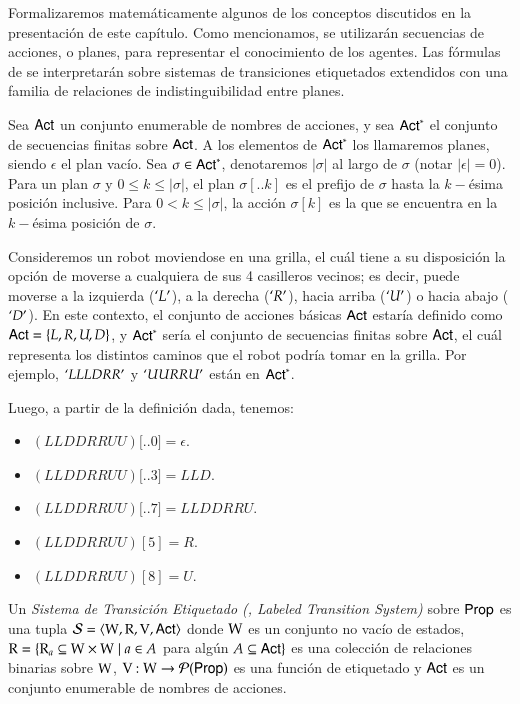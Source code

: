 Formalizaremos matemáticamente algunos de los conceptos discutidos en la presentación de este capítulo. Como mencionamos, se 
utilizarán secuencias de acciones, o planes, para representar el conocimiento de los agentes. Las fórmulas de \KHilogic se interpretarán 
sobre sistemas de transiciones etiquetados extendidos con una familia de relaciones de indistinguibilidad entre planes.

\begin{definicion}
    Sea ${\rm \sf Act}$ un conjunto enumerable de nombres de acciones, y sea ${\rm \sf Act}^*$ el conjunto de secuencias finitas sobre ${\rm \sf Act}$. 
    A los elementos de ${\rm \sf Act}^*$ los llamaremos planes, siendo $\epsilon$ el plan vacío. Sea $\sigma \in {\rm \sf Act}^*$, denotaremos $|\sigma|$ 
    al largo de $\sigma$ (notar $|\epsilon| = 0$). Para un plan $\sigma$ y $0 \leq k \leq |\sigma|$, el plan $\sigma[..k]$ es el prefijo 
    de $\sigma$ hasta la $k-$ésima posición inclusive. Para $0 < k \leq |\sigma|$, la acción $\sigma[k]$ es la que se encuentra en la 
    $k-$ésima posición de $\sigma$.  
\end{definicion}

\begin{ejemplo}
    Consideremos un robot moviendose en una grilla, el cuál tiene a su disposición la opción de moverse a cualquiera de sus 4 casilleros vecinos; es decir,
    puede moverse a la izquierda ($`L'$), a la derecha ($`R'$), hacia arriba ($`U'$) o hacia abajo ($`D'$). En este contexto, el conjunto de acciones básicas 
    ${\rm \sf Act}$ estaría definido como ${\rm \sf Act} = \{L,R,U,D\}$, y ${\rm \sf Act}^*$ sería el conjunto de secuencias finitas sobre ${\rm \sf Act}$, el cuál representa los distintos 
    caminos que el robot podría tomar en la grilla. Por ejemplo, $`LLLDRR'$ y $`UURRU'$ están en ${\rm \sf Act}^*$. 

    Luego, a partir de la definición dada, tenemos:
    \begin{itemize}
        \item $(LLDDRRUU)[$..$0] = \epsilon$.
        \item $(LLDDRRUU)[$..$3] = LLD$.
        \item $(LLDDRRUU)[$..$7] = LLDDRRU$.
        \item $(LLDDRRUU)[5] = R$.
        \item $(LLDDRRUU)[8] = U$.
    \end{itemize}
\end{ejemplo}


\begin{definicion}
    Un \emph{Sistema de Transición Etiquetado (\lts, Labeled Transition System)} sobre ${\rm \sf Prop}$ es una tupla $\mathcal{S} = \langle \mathrm{W}, \mathrm{R}, \mathrm{V}, {\rm \sf Act} \rangle$ 
    donde $\mathrm{W}$ es un conjunto no vacío de estados, $\mathrm{R} = \{\mathrm{R}_a \subseteq \mathrm{W} \times \mathrm{W} \mid a \in A$ para algún $A \subseteq {\rm \sf Act}\}$ es 
    una colección de relaciones binarias sobre $\mathrm{W}$, $\mathrm{V} : \mathrm{W} \to \mathcal{P}({\rm \sf Prop})$ es una función de etiquetado y ${\rm \sf Act}$ es un 
    conjunto enumerable de nombres de acciones.
\end{definicion}

